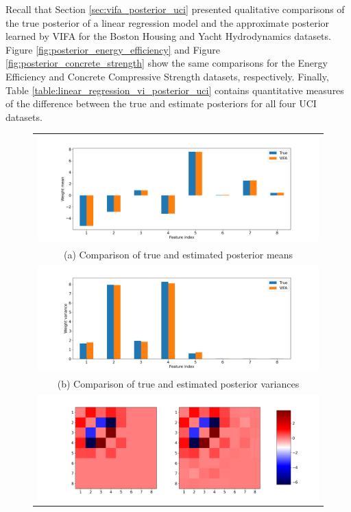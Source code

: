 \documentclass[msc,deptreport.inf]{infthesis} %
\begin{document}
Recall that Section \ref{sec:vifa_posterior_uci} presented qualitative comparisons of the true posterior of a linear regression model and the approximate posterior learned by VIFA for the Boston Housing and Yacht Hydrodynamics datasets. Figure \ref{fig:posterior_energy_efficiency} and Figure \ref{fig:posterior_concrete_strength} show the same comparisons for the Energy Efficiency and Concrete Compressive Strength datasets, respectively. Finally, Table \ref{table:linear_regression_vi_posterior_uci} contains quantitative measures of the difference between the true and estimate posteriors for all four UCI datasets. 

\begin{figure}[!htbp] 
	\begin{tabular}{c}
		\includegraphics[width=140mm]{plots/energy_efficiency_posterior_mean.png} \\
		(a) Comparison of true and estimated posterior means \\[6pt] 
		 \includegraphics[width=140mm]{plots/energy_efficiency_posterior_variance.png} \\
		(b) Comparison of true and estimated posterior variances \\[6pt] 
		\includegraphics[width=140mm]{plots/energy_efficiency_posterior_covariance.png} \\

\end{tabular}
\end{figure}
\end{document}
